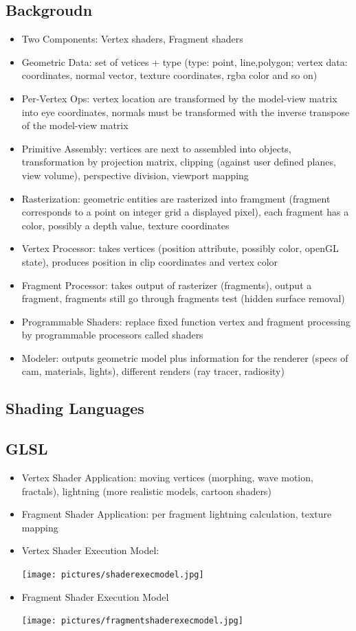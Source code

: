 \documentclass[11pt,a4paper]{article}
\begin{document}
	\subsection{Backgroudn}
	\begin{itemize}
		\item Two Components: Vertex shaders, Fragment shaders
		\item Geometric Data: set of vetices + type (type: point, line,polygon; vertex data: coordinates, normal vector, texture coordinates, rgba color and so on)
		\item Per-Vertex Ops: vertex location are transformed by the model-view matrix into eye coordinates, normals must be transformed with the inverse transpose of the model-view matrix
		\item Primitive Assembly: vertices are next to assembled into objects, transformation by projection matrix, clipping (against user defined planes, view volume), perspective division, viewport mapping
		\item Rasterization: geometric entities are rasterized into framgment (fragment corresponds to a point on integer grid a displayed pixel), each fragment has a color, possibly a depth value, texture coordinates
		\item Vertex Processor: takes vertices (position attribute, possibly color, openGL state), produces position in clip coordinates and vertex color
		\item Fragment Processor: takes output of rasterizer (fragments), output a fragment, fragments still go through fragments test (hidden surface removal)
		\item Programmable Shaders: replace fixed function vertex and fragment processing by programmable processors called shaders
		\item Modeler: outputs geometric model plus information for the renderer (specs of cam, materials, lights), different renders (ray tracer, radiosity)
	\end{itemize}
	\subsection{Shading Languages}
	\subsection{GLSL}
	\begin{itemize}
		\item Vertex Shader Application: moving vertices (morphing, wave motion, fractals), lightning (more realistic models, cartoon shaders)
		\item Fragment Shader Application: per fragment lightning calculation, texture mapping
		\item Vertex Shader Execution Model:
		\begin{center}
			\texttt{[image: pictures/shaderexecmodel.jpg]}
		\end{center}
		\item Fragment Shader Execution Model
		\begin{center}
			\texttt{[image: pictures/fragmentshaderexecmodel.jpg]}
		\end{center}
	\end{itemize}
\end{document}

